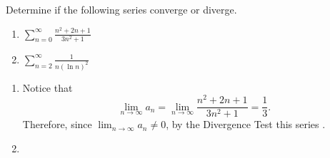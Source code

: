 \documentclass[noinstructornotes]{ximera}
\begin{document}
\begin{problem}
Determine if the following series converge or diverge.
	\begin{enumerate}
%	
%	
%	
	\item  $\sum_{n=0}^\infty \frac{n^2 + 2n + 1}{3n^2 +1}$
%	
	\item  $\sum_{n=2}^\infty \frac{1}{n(\ln n)^2}$
%	
%	
	\end{enumerate}
%	
	\begin{freeResponse}
		\begin{enumerate}
%	
%		
%		
%	
%		
%		
%		
%	
		\item  {}
		
		Notice that
			\[
			\lim_{n \to \infty} a_n = \lim_{n \to \infty} \frac{n^2 + 2n + 1}{3n^2 +1} = \frac{1}{3}.
			\]
		Therefore, since $\lim_{n \to \infty} a_n \neq 0$, by the Divergence Test this series .
		
		
	
		\item  {}
		

\end{enumerate}
\end{freeResponse}
\end{problem}
\end{document}
